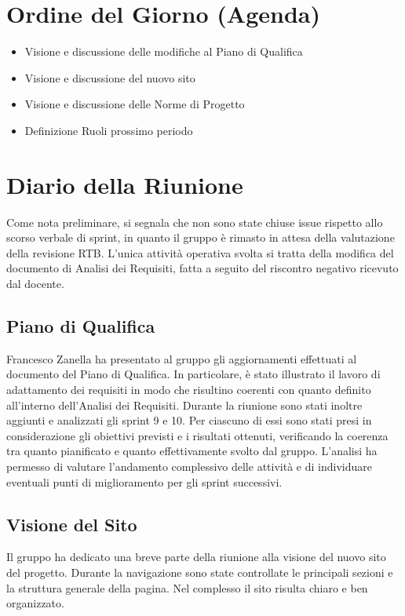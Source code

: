 \documentclass[a4paper, 11pt, oneside]{scrartcl} %
\begin{document}
\section{Ordine del Giorno (Agenda)}
\begin{itemize}
    \item[1.] Visione e discussione delle modifiche al Piano di Qualifica 
    \item[2.] Visione e discussione del nuovo sito
    \item[3.] Visione e discussione delle Norme di Progetto
    \item[4.] Definizione Ruoli prossimo periodo
\end{itemize}

\newpage
\section{Diario della Riunione}

Come nota preliminare, si segnala che non sono state chiuse issue rispetto allo scorso verbale di sprint, in quanto il gruppo è rimasto in attesa della valutazione della revisione RTB. L'unica attività operativa svolta si tratta della modifica del documento di Analisi dei Requisiti, fatta a seguito del riscontro negativo ricevuto dal docente.

\subsection{Piano di Qualifica}
Francesco Zanella ha presentato al gruppo gli aggiornamenti effettuati al documento del Piano di Qualifica. In particolare, è stato illustrato il lavoro di adattamento dei requisiti in modo che risultino coerenti con quanto definito all'interno dell'Analisi dei Requisiti. 
Durante la riunione sono stati inoltre aggiunti e analizzati gli sprint 9 e 10. Per ciascuno di essi sono stati presi in considerazione gli obiettivi previsti e i risultati ottenuti, verificando la coerenza tra quanto pianificato e quanto effettivamente svolto dal gruppo. L'analisi ha permesso di valutare l'andamento complessivo delle attività e di individuare eventuali punti di miglioramento per gli sprint successivi.

\subsection{Visione del Sito}
Il gruppo ha dedicato una breve parte della riunione alla visione del nuovo sito del progetto. Durante la navigazione sono state controllate le principali sezioni e la struttura generale della pagina.
Nel complesso il sito risulta chiaro e ben organizzato. 
\end{document}
